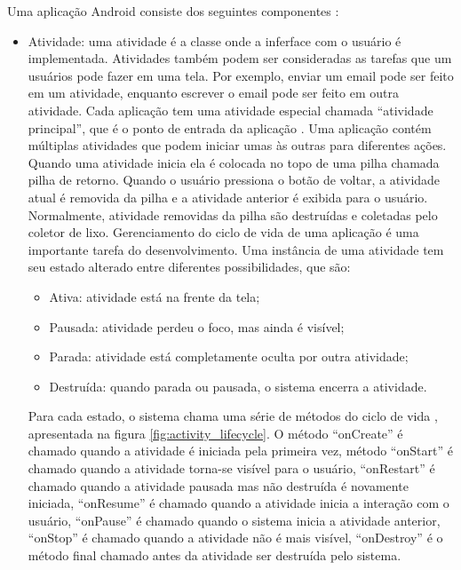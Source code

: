 Uma aplicação Android consiste dos seguintes componentes \cite{Fundamental2016}:
\begin{itemize}
    \item Atividade: uma atividade é a classe onde a inferface com o usuário é
    implementada. Atividades também podem ser consideradas as tarefas que um
    usuários pode fazer em uma tela. Por exemplo, enviar um email pode ser feito
    em um atividade, enquanto escrever o email pode ser feito em outra atividade.
    Cada aplicação tem uma atividade especial chamada “atividade principal”, que
    é o ponto de entrada da aplicação \cite{Atividade2016}. Uma aplicação contém
    múltiplas atividades que podem iniciar umas às outras para diferentes ações.
    Quando uma atividade inicia ela é colocada no topo de uma pilha chamada pilha
    de retorno. Quando o usuário pressiona o botão de voltar, a atividade atual
    é removida da pilha e a atividade anterior é exibida para o usuário. Normalmente,
    atividade removidas da pilha são destruídas e coletadas pelo coletor de lixo.
    Gerenciamento do ciclo de vida de uma aplicação é uma importante tarefa do
    desenvolvimento. Uma instância de uma atividade tem seu estado alterado entre
    diferentes possibilidades, que são:
    \begin{itemize}
        \item Ativa: atividade está na frente da tela;
        \item Pausada: atividade perdeu o foco, mas ainda é visível;
        \item Parada: atividade está completamente oculta por outra atividade;
        \item Destruída: quando parada ou pausada, o sistema encerra a atividade.
    \end{itemize}
    Para cada estado, o sistema chama uma série de métodos do ciclo de vida \cite{CicloVidaAtividade2016},
    apresentada na figura \ref{fig:activity_lifecycle}. O método “onCreate” é
    chamado quando a atividade é iniciada pela primeira vez, método “onStart” é
    chamado quando a atividade torna-se visível para o usuário, “onRestart” é
    chamado quando a atividade pausada mas não destruída é novamente iniciada,
    “onResume” é  chamado quando a atividade inicia a interação com o usuário,
    “onPause” é chamado quando o sistema inicia a atividade anterior, “onStop” é
    chamado quando a atividade não é mais visível, “onDestroy” é o método final
    chamado antes da atividade ser destruída pelo sistema.
    \begin{figure}[htb]

\end{figure}
\end{itemize}
